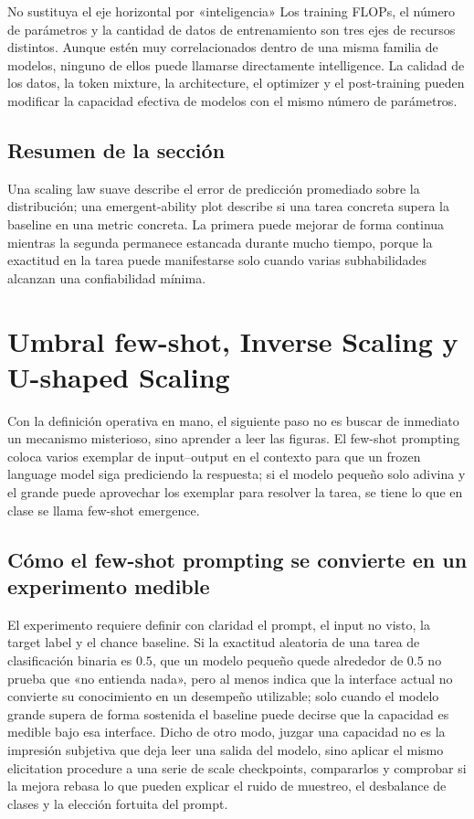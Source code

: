 \documentclass[a4paper]{article}
\begin{document}
\begin{warningbox}{No sustituya el eje horizontal por «inteligencia»}
Los training FLOPs, el número de parámetros y la cantidad de datos de entrenamiento son tres ejes de recursos distintos. Aunque estén muy correlacionados dentro de una misma familia de modelos, ninguno de ellos puede llamarse directamente intelligence. La calidad de los datos, la token mixture, la architecture, el optimizer y el post-training pueden modificar la capacidad efectiva de modelos con el mismo número de parámetros.
\end{warningbox}

\subsection{Resumen de la sección}

Una scaling law suave describe el error de predicción promediado sobre la distribución; una emergent-ability plot describe si una tarea concreta supera la baseline en una metric concreta. La primera puede mejorar de forma continua mientras la segunda permanece estancada durante mucho tiempo, porque la exactitud en la tarea puede manifestarse solo cuando varias subhabilidades alcanzan una confiabilidad mínima.
\section{Umbral few-shot, Inverse Scaling y U-shaped Scaling}

Con la definición operativa en mano, el siguiente paso no es buscar de inmediato un mecanismo misterioso, sino aprender a leer las figuras. El few-shot prompting coloca varios exemplar de input--output en el contexto para que un frozen language model siga prediciendo la respuesta; si el modelo pequeño solo adivina y el grande puede aprovechar los exemplar para resolver la tarea, se tiene lo que en clase se llama few-shot emergence.

\subsection{Cómo el few-shot prompting se convierte en un experimento medible}

El experimento requiere definir con claridad el prompt, el input no visto, la target label y el chance baseline. Si la exactitud aleatoria de una tarea de clasificación binaria es $0.5$, que un modelo pequeño quede alrededor de $0.5$ no prueba que «no entienda nada», pero al menos indica que la interface actual no convierte su conocimiento en un desempeño utilizable; solo cuando el modelo grande supera de forma sostenida el baseline puede decirse que la capacidad es medible bajo esa interface. Dicho de otro modo, juzgar una capacidad no es la impresión subjetiva que deja leer una salida del modelo, sino aplicar el mismo elicitation procedure a una serie de scale checkpoints, compararlos y comprobar si la mejora rebasa lo que pueden explicar el ruido de muestreo, el desbalance de clases y la elección fortuita del prompt.
\end{document}
